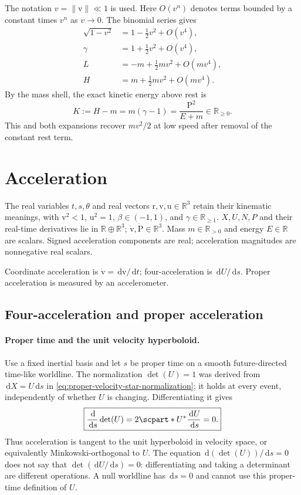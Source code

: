 \documentclass[11pt]{article}
\newcommand{\pv}[1]{{#1}}
\newcommand{\vstyle}[1]{{\bm{\mathrm{#1}}}}
\newcommand{\pN}{\pv{N}}
\newcommand{\pP}{\pv{P}}
\newcommand{\pU}{\pv{U}}
\newcommand{\pX}{\pv{X}}
\numberwithin{equation}{section}
\newcommand{\R}{\mathbb{R}}
\newcommand{\br}{\vstyle{r}}
\newcommand{\bv}{\vstyle{v}}
\newcommand{\bu}{\vstyle{u}}
\newcommand{\bp}{\vstyle{P}}
\newcommand{\dd}{\,\mathrm d}
\begin{document}
The notation $v=\lVert\bv\rVert\ll1$ is used.  Here $O(v^n)$ denotes terms bounded
by a constant times $v^n$ as $v\to0$.  The binomial series gives
\begin{align*}
 \sqrt{1-v^2}&=1-\tfrac12v^2+O(v^4),\\
 \gamma&=1+\tfrac12v^2+O(v^4),\\
 L&=-m+\tfrac12mv^2+O(mv^4),\\
 H&=m+\tfrac12mv^2+O(mv^4).
\end{align*}
By the mass shell, the exact kinetic energy above rest is
\begin{equation*}
 K:=H-m=m(\gamma-1)=\frac{\bp^2}{E+m}\in\R_{\ge0}.
\end{equation*}
This and both expansions recover $mv^2/2$
at low speed after removal of the constant rest term.

\section{Acceleration}
\label{sec:acceleration}

The real variables $t,s,\theta$ and real vectors $\br,\bv,\bu\in\R^3$
retain their kinematic meanings, with $\bv^2<1$, $\bu^2=1$,
$\beta\in(-1,1)$, and $\gamma\in\R_{\ge1}$.
$\pX,\pU,\pN,\pP$ and their real-time derivatives lie in
$\R\oplus\R^3$; $\dot\bv,\dot\bp\in\R^3$.
Mass $m\in\R_{>0}$ and energy $E\in\R$ are scalars.
Signed acceleration components are real; acceleration magnitudes are
nonnegative real scalars.

Coordinate acceleration is $\dot\bv=\dd\bv/\dd t$; four-acceleration is
$\dd\pU/\dd s$. Proper acceleration is measured by an accelerometer.

\subsection{Four-acceleration and proper acceleration}
\label{sec:proper-acceleration}

\paragraph{Proper time and the unit velocity hyperboloid.}
Use a fixed inertial basis and let $s$ be proper time on a smooth
future-directed time-like worldline. The normalization
$\det(\pU)=1$ was derived from $\dd\pX=\pU\dd s$ in
\eqref{eq:proper-velocity-star-normalization}; it holds at every
event, independently of whether $\pU$ is changing.
Differentiating it gives
\begin{equation}
 \boxed{\frac{\dd}{\dd s}\det(\pU)
 =2\scpart*{\pU^*\frac{\dd\pU}{\dd s}}=0.}
 \label{eq:velocity-hyperboloid-tangent}
\end{equation}
Thus acceleration is tangent to the unit hyperboloid in velocity
space, or equivalently Minkowski-orthogonal to $\pU$.
The equation $\dd(\det(\pU))/\dd s=0$ does not say that
$\det(\dd\pU/\dd s)=0$: differentiating and taking a determinant
are different operations. A null worldline has $\dd s=0$ and
cannot use this proper-time definition of $\pU$.
\end{document}
